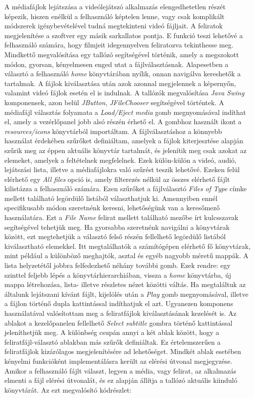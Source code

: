 A médiafájlok lejátszása a videólejátszó alkalmazás elengedhetetlen részét képezik, hiszen enélkül a felhasználó képtelen lenne, vagy csak komplikált módszerek igénybevételével tudná megtekinteni videó fájljait. A feliratok megjelenítése a szoftver egy másik sarkallatos pontja. E funkció teszi lehetővé a felhasználó számára, hogy filmjeit idegennyelven feliratozva tekinthesse meg. Mindkettő megvalósítása egy tallózó segítségével történik, amely a megszokott módon, gyorsan, kényelmesen enged utat a fájlválasztásnak. Alapesetben a választó a felhasználó \textit{home} könyvtárában nyílik, onnan navigálva kereshetők a tartalmak. A fájlok kiválasztása után azok azonnal megjelennek a képernyőn, valamint videó fájlok esetén el is indulnak. A tallózók megvalósítása \textit{Java Swing} komponensek, azon belül \textit{JButton}, \textit{JFileChooser} segítségével történtek. A médiafájl választás folyamata a \textit{Load/Eject media} gomb megnyomásával indíthat el, amely a vezérlőpanel jobb alsó részén érhető el. A gombhoz használt ikont a \textit{resources/icons} könyvtárból importáltam. A fájlválasztáshoz a könnyebb használat érdekében szűrőket definiáltam, amelyek a fájlok kiterjesztése alapján szűrik meg az éppen aktuális könyvtár tartalmát, és jelenítik meg csak azokat az elemeket, amelyek a feltételnek megfelelnek. Ezek külön-külön a videó, audió, lejátszási lista, illetve a médiafájlokra való szűrést teszik lehetővé. Ezeken felül elérhető egy \textit{All files} opció is, amely filterezés nélkül az összes elérhető fájlt kilistázza a felhasználó számára. Ezen szűrőket a fájlválasztó \textit{Files of Type} címke mellett található legördülő listából választhatjuk ki. Amennyiben ennél specifikusabb módon szeretnénk keresni, lehetőségünk van a keresőmező használatára. Ezt a \textit{File Name} felirat mellett található mezőbe írt kulcsszavak segítségével tehetjük meg. Ha gyorsabba szeretnénk navigálni a könyvtárak között, ezt megtehetjük a választó felső részén fellelhető legördülő listából kiválasztható elemekkel. Itt megtalálhatók a számítógépen elérhető fő könyvtárak, mint például a különböző meghajtók, asztal és egyéb nagyobb méretű mappák. A lista helyzetétől jobbra felfedezhető néhány további gomb. Ezek rendre: egy szinttel feljebb lépés a könyvtárhierarchiában, vissza a \textit{home} könyvtárba, új mappa létrehozása, lista- illetve részletes nézet közötti váltás. Ha megtaláltuk az általunk lejátszani kívánt fájlt, kijelölés után a \textit{Play} gomb megnyomásával, illetve a fájlon történő dupla kattintással indíthatjuk el azt. Ugyanezen komponens használatával valósítottam meg a feliratfájlok kiválasztásának kezelését is. Az ablakot a kezelőpanelen fellelhető \textit{Select subtitle} gombra történő kattintással jeleníthetjük meg. A különbség csupán annyi a két ablak között, hogy a feliratfájl-választó ablakban más szűrők definiáltak. Ez értelemszerűen a feliratfájlok kizárólagos megjelenítésére ad lehetőséget. Mindkét ablak esetében kényelmi funkcióként implementálásra került az elérési útvonal megjegyzése. Amikor a felhasználó fájlt választ, legyen a média, vagy felirat, az alkalmazás elmenti a fájl elérési útvonalát, és ez alapján állítja a tallózó aktuális kiinduló könyvtárát. Az ezt megvalósító kódrészlet:

